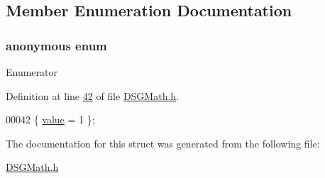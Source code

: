 \subsection{Member Enumeration Documentation}
\hypertarget{struct_d_s_g_1_1_factorial_3_010_01_4_a6bfe1b9c1bfc0bdeaceb03842acb1927}{\subsubsection[{anonymous enum}]{\setlength{\rightskip}{0pt plus 5cm}anonymous enum}}\label{struct_d_s_g_1_1_factorial_3_010_01_4_a6bfe1b9c1bfc0bdeaceb03842acb1927}
\begin{Desc}
\item[Enumerator]\par
\begin{description}
\item[{\em 
\hypertarget{struct_d_s_g_1_1_factorial_3_010_01_4_a6bfe1b9c1bfc0bdeaceb03842acb1927abba93a0ae84b21f3c62dd8baa14039eb}{value}\label{struct_d_s_g_1_1_factorial_3_010_01_4_a6bfe1b9c1bfc0bdeaceb03842acb1927abba93a0ae84b21f3c62dd8baa14039eb}
}]\end{description}
\end{Desc}


Definition at line \hyperlink{_d_s_g_math_8h_source_l00042}{42} of file \hyperlink{_d_s_g_math_8h_source}{D\+S\+G\+Math.\+h}.


\begin{DoxyCode}
00042 \{ \hyperlink{struct_d_s_g_1_1_factorial_3_010_01_4_a6bfe1b9c1bfc0bdeaceb03842acb1927abba93a0ae84b21f3c62dd8baa14039eb}{value} = 1 \};
\end{DoxyCode}


The documentation for this struct was generated from the following file\+:\begin{DoxyCompactItemize}
\item 
\hyperlink{_d_s_g_math_8h}{D\+S\+G\+Math.\+h}\end{DoxyCompactItemize}
